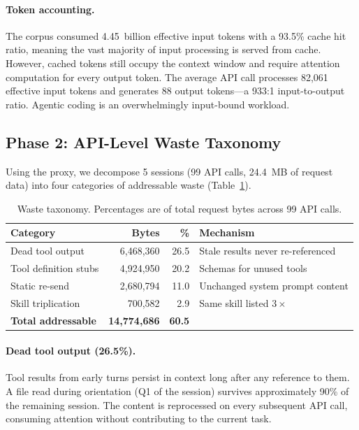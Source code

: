 \paragraph{Token accounting.}
The corpus consumed 4.45~billion effective input tokens with a
93.5\% cache hit ratio, meaning the vast majority of input
processing is served from cache. However, cached tokens still
occupy the context window and require attention computation for
every output token. The average API call processes 82{,}061
effective input tokens and generates 88 output tokens---a
933:1 input-to-output ratio. Agentic coding is an overwhelmingly
input-bound workload.

\subsection{Phase 2: API-Level Waste Taxonomy}
\label{sec:taxonomy}

Using the proxy, we decompose 5 sessions (99 API calls, 24.4~MB
of request data) into four categories of addressable waste
(Table~\ref{tab:waste-taxonomy}).

\begin{table}[ht]
\centering
\caption{Waste taxonomy. Percentages are of total request bytes
  across 99 API calls.}
\label{tab:waste-taxonomy}
\small
\begin{tabular}{@{}lrrl@{}}
\toprule
\textbf{Category} & \textbf{Bytes} & \textbf{\%} & \textbf{Mechanism} \\
\midrule
Dead tool output & 6{,}468{,}360 & 26.5 & Stale results never re-referenced \\
Tool definition stubs & 4{,}924{,}950 & 20.2 & Schemas for unused tools \\
Static re-send & 2{,}680{,}794 & 11.0 & Unchanged system prompt content \\
Skill triplication & 700{,}582 & 2.9 & Same skill listed $3\times$ \\
\midrule
\textbf{Total addressable} & \textbf{14{,}774{,}686} & \textbf{60.5} & \\
\bottomrule
\end{tabular}
\end{table}

\paragraph{Dead tool output (26.5\%).}
Tool results from early turns persist in context long after any
reference to them. A file read during orientation (Q1 of the
session) survives approximately 90\% of the remaining session.
The content is reprocessed on every subsequent API call, consuming
attention without contributing to the current task.


